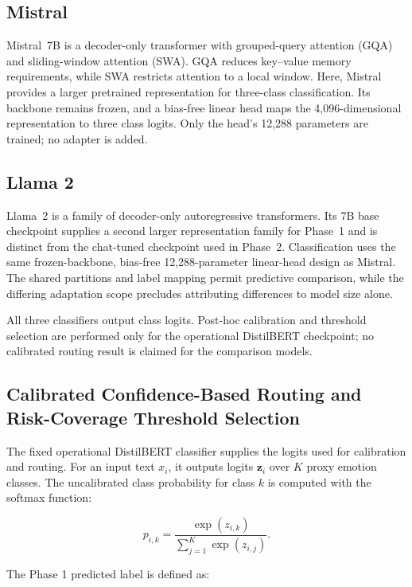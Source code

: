 \documentclass{ieeeaccess}
\begin{document}
\subsection{Mistral}

Mistral~7B \cite{ref13} is a decoder-only transformer with grouped-query attention (GQA) and sliding-window attention (SWA). GQA reduces key--value memory requirements, while SWA restricts attention to a local window. Here, Mistral provides a larger pretrained representation for three-class classification. Its backbone remains frozen, and a bias-free linear head maps the 4,096-dimensional representation to three class logits. Only the head's 12,288 parameters are trained; no adapter is added.

\subsection{Llama 2}

Llama~2 \cite{ref14} is a family of decoder-only autoregressive transformers. Its 7B base checkpoint supplies a second larger representation family for Phase~1 and is distinct from the chat-tuned checkpoint used in Phase~2. Classification uses the same frozen-backbone, bias-free 12,288-parameter linear-head design as Mistral. The shared partitions and label mapping permit predictive comparison, while the differing adaptation scope precludes attributing differences to model size alone.

All three classifiers output class logits. Post-hoc calibration and threshold selection are performed only for the operational DistilBERT checkpoint; no calibrated routing result is claimed for the comparison models.

\subsection{Calibrated Confidence-Based Routing and Risk-Coverage Threshold Selection}

The fixed operational DistilBERT classifier supplies the logits used for calibration and routing. For an input text $x_i$, it outputs logits $\mathbf{z}_i$ over $K$ proxy emotion classes. The uncalibrated class probability for class $k$ is computed with the softmax function:

\begin{equation}
p_{i,k}=\frac{\exp(z_{i,k})}{\sum_{j=1}^{K}\exp(z_{i,j})}.
\end{equation}

The Phase 1 predicted label is defined as:
\end{document}
